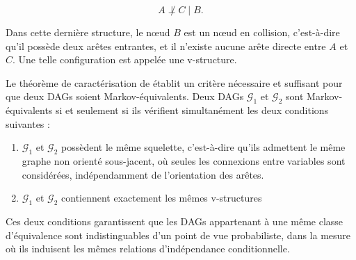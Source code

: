 \documentclass{article}
\begin{document}
$$
    A \not\perp C \mid B.
$$

Dans cette dernière structure, le nœud $B$ est un nœud en collision, c'est-à-dire qu'il possède deux arêtes entrantes, et
il n'existe aucune arête directe entre $A$ et $C$. Une telle configuration est appelée une v-structure.

Le théorème de caractérisation de \citet{10.5555/534975} établit un critère nécessaire et suffisant pour que deux DAGs soient
Markov-équivalents. Deux DAGs $\mathcal{G}_1$ et $\mathcal{G}_2$ sont Markov-équivalents si et seulement si ils vérifient
simultanément les deux conditions suivantes :

\begin{enumerate}[label=(\roman*)]
    \item $\mathcal{G}_1$ et $\mathcal{G}_2$ possèdent le même squelette, c'est-à-dire qu'ils admettent le même graphe non orienté
          sous-jacent, où seules les connexions entre variables sont considérées, indépendamment de l'orientation des arêtes.
    \item $\mathcal{G}_1$ et $\mathcal{G}_2$ contiennent exactement les mêmes v-structures
\end{enumerate}


Ces deux conditions garantissent que les DAGs appartenant à une même classe d'équivalence sont indistinguables d'un point de
vue probabiliste, dans la mesure où ils induisent les mêmes relations d'indépendance conditionnelle.
\end{document}
